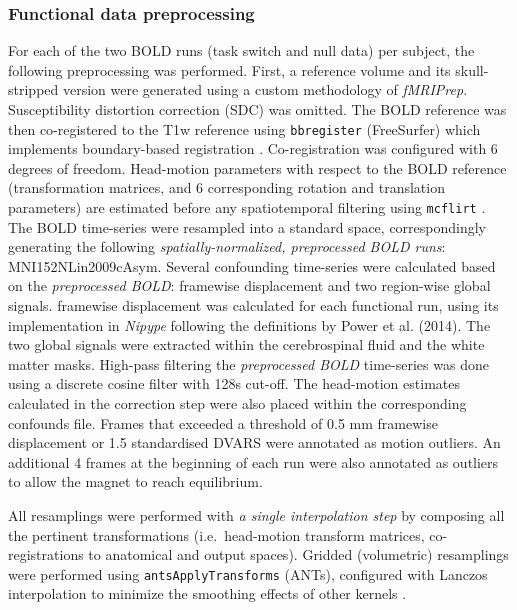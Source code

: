\documentclass[phd,appendix,figures]{uithesis}
\begin{document}
\subsubsection*{Functional data preprocessing}
\label{methods:func2}

For each of the two BOLD runs (task switch and null data) per subject,
the following preprocessing was performed.
First, a reference volume and its skull-stripped version were generated
using a custom methodology of \emph{fMRIPrep}.
Susceptibility distortion correction (SDC) was omitted.
The BOLD reference was then co-registered to the T1w reference using \texttt{bbregister}
(FreeSurfer) which implements boundary-based registration \cite{bbr}.
Co-registration was configured with 6 degrees of freedom.
Head-motion parameters with respect to the BOLD reference (transformation matrices,
and 6 corresponding rotation and translation parameters) are estimated before any
spatiotemporal filtering using \texttt{mcflirt} \cite[FSL 5.0.9,]{mcflirt}.
The BOLD time-series were resampled into a standard space, correspondingly
generating the following \emph{spatially-normalized, preprocessed BOLD runs}:
MNI152NLin2009cAsym.
Several confounding time-series were calculated based on the \emph{preprocessed BOLD}:
framewise displacement and two region-wise global signals.
framewise displacement was calculated for each functional run, using its
implementation in \emph{Nipype} following the definitions
by Power et al. (2014)\cite{power_fd_dvars}.
The two global signals were extracted within the
cerebrospinal fluid and the white matter masks.
High-pass filtering the \emph{preprocessed BOLD} time-series was done using
a discrete cosine filter with 128s cut-off.
The head-motion estimates calculated in
the correction step were also placed within the corresponding confounds file. 
Frames that exceeded a threshold of 0.5 mm framewise displacement or 1.5 standardised DVARS
were annotated as motion outliers.
An additional 4 frames at the beginning of each run were also
annotated as outliers to allow the magnet to reach equilibrium.

All resamplings were performed with \emph{a single interpolation step} by composing all the pertinent
transformations (i.e.~head-motion transform matrices, co-registrations to anatomical
and output spaces).
Gridded (volumetric) resamplings were performed using \texttt{antsApplyTransforms} (ANTs),
configured with Lanczos interpolation to minimize the smoothing effects of other kernels
\cite{lanczos}.
\end{document}
